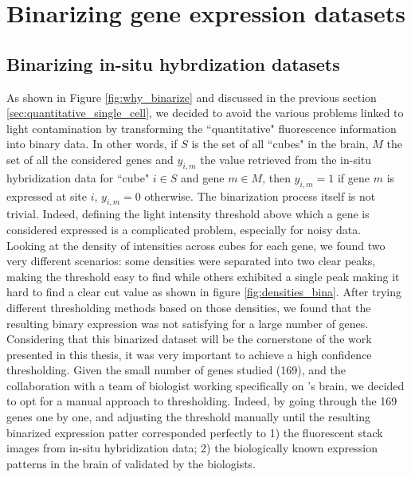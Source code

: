 \section{Binarizing gene expression datasets}\label{sec:binarizing}
  \subsection*{Binarizing in-situ hybrdization datasets}
	As shown in Figure \ref{fig:why_binarize} and discussed in the previous section \ref{sec:quantitative_single_cell}, we decided to avoid the various problems linked to light contamination by transforming the ``quantitative" fluorescence information into binary data. In other words, if $S$ is the set of all ``cubes" in the brain, $M$ the set of all the considered genes and $y_{i,m}$ the value retrieved from the in-situ hybridization data for ``cube" $i \in S$ and gene $m \in M$, then  $y_{i,m} = 1$ if gene $m$ is expressed at site $i$, $y_{i,m} = 0$ otherwise. The binarization process itself is not trivial. Indeed, defining the light intensity threshold above which a gene is considered expressed is a complicated problem, especially for noisy data.\\

	Looking at the density of intensities across cubes for each gene, we found two very different scenarios: some densities were separated into two clear peaks, making the threshold easy to find while others exhibited a single peak making it hard to find a clear cut value as shown in figure \ref{fig:densities_bina}. After trying different thresholding methods based on those densities, we found that the resulting binary expression was not satisfying for a large number of genes. Considering that this binarized dataset will be the cornerstone of the work presented in this thesis, it was very important to achieve a high confidence thresholding. Given the small number of genes studied (169), and the collaboration with a team of biologist working specifically on \platyfull{}'s brain, we decided to opt for a manual approach to thresholding. Indeed, by going through the 169 genes one by one, and adjusting the threshold manually until the resulting binarized expression patter corresponded perfectly to 1) the fluorescent stack images from in-situ hybridization data; 2) the biologically known expression patterns in the brain of \platy{} validated by the biologists.\\
	
